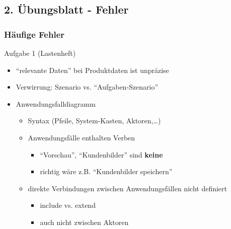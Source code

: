 \documentclass[18pt]{beamer}
\begin{document}
\subsection{2. Übungsblatt - Fehler}
\begin{frame}
		\frametitle{Häufige Fehler}
		\begin{block}{Aufgabe 1 (Lastenheft)}
			\begin{itemize}
				\item \enquote{relevante Daten} bei Produktdaten ist unpräzise
				\pause
				\item Verwirrung: Szenario vs. \enquote{Aufgaben-Szenario}
				\pause
				\item Anwendungsfalldiagramm
				\begin{itemize}
					\item Syntax (Pfeile, System-Kasten, Aktoren,\dots)
					\item Anwendungsfälle enthalten Verben
					\begin{itemize}
						\item \enquote{Vorschau}, \enquote{Kundenbilder} sind \textbf{keine}
						\item richtig wäre z.B. \enquote{Kundenbilder speichern}
					\end{itemize}
					\item direkte Verbindungen zwischen Anwendungsfällen nicht definiert
					\begin{itemize}
						\item include vs. extend
						\item auch nicht zwischen Aktoren
					\end{itemize}
				\end{itemize}
			\end{itemize}
		\end{block}
\end{frame}
\end{document}
